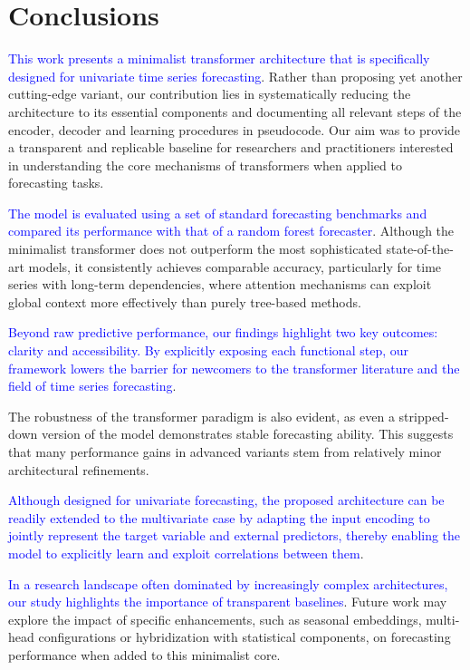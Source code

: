 \documentclass[algorithms,article,submit,pdftex,moreauthors]{Definitions/mdpi}
\begin{document}
\section{Conclusions} \label{sec:conclusions}

\textcolor{blue}{This work presents a minimalist transformer architecture that is specifically designed for univariate time series forecasting}. Rather than proposing yet another cutting-edge variant, our contribution lies in systematically reducing the architecture to its essential components and documenting all relevant steps of the encoder, decoder and learning procedures in pseudocode. Our aim was to provide a transparent and replicable baseline for researchers and practitioners interested in understanding the core mechanisms of transformers when applied to forecasting tasks.

\textcolor{blue}{The model is evaluated using a set of standard forecasting benchmarks and compared its performance with that of a random forest forecaster}. Although the minimalist transformer does not outperform the most sophisticated state-of-the-art models, it consistently achieves comparable accuracy, particularly for time series with long-term dependencies, where attention mechanisms can exploit global context more effectively than purely tree-based methods.

\textcolor{blue}{Beyond raw predictive performance, our findings highlight two key outcomes: clarity and accessibility. By explicitly exposing each functional step, our framework lowers the barrier for newcomers to the transformer literature and the field of time series forecasting}.

The robustness of the transformer paradigm is also evident, as even a stripped-down version of the model demonstrates stable forecasting ability. This suggests that many performance gains in advanced variants stem from relatively minor architectural refinements.

\textcolor{blue}{Although designed for univariate forecasting, the proposed architecture can be readily extended to the multivariate case by adapting the input encoding to jointly represent the target variable and external predictors, thereby enabling the model to explicitly learn and exploit correlations between them}.

\textcolor{blue}{In a research landscape often dominated by increasingly complex architectures, our study highlights the importance of transparent baselines}. Future work may explore the impact of specific enhancements, such as seasonal embeddings, multi-head configurations or hybridization with statistical components, on forecasting performance when added to this minimalist core.
\end{document}
